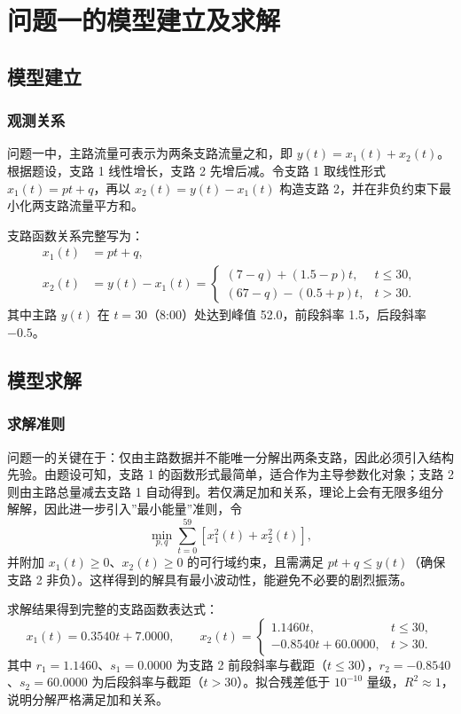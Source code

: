 \documentclass[UTF8,a4paper,fontset=none]{ctexart}
\numberwithin{equation}{section}
\begin{document}
\section{问题一的模型建立及求解}
\subsection{模型建立}
\subsubsection{观测关系}
问题一中，主路流量可表示为两条支路流量之和，即 $y(t)=x_1(t)+x_2(t)$。根据题设，支路 1 线性增长，支路 2 先增后减。令支路 1 取线性形式 $x_1(t)=pt+q$，再以 $x_2(t)=y(t)-x_1(t)$ 构造支路 2，并在非负约束下最小化两支路流量平方和。

支路函数关系完整写为：
\begin{align}
  x_1(t) &= pt + q, \label{eq:q1_b1} \\
  x_2(t) &= y(t) - x_1(t) = \begin{cases}
    (7-q)+(1.5-p)t, & t\le 30, \\
    (67-q)-(0.5+p)t, & t>30.
  \end{cases} \label{eq:q1_b2}
\end{align}
其中主路 $y(t)$ 在 $t=30$（8:00）处达到峰值 52.0，前段斜率 1.5，后段斜率 $-0.5$。

\subsection{模型求解}
\subsubsection{求解准则}
问题一的关键在于：仅由主路数据并不能唯一分解出两条支路，因此必须引入结构先验。由题设可知，支路 1 的函数形式最简单，适合作为主导参数化对象；支路 2 则由主路总量减去支路 1 自动得到。若仅满足加和关系，理论上会有无限多组分解解，因此进一步引入''最小能量''准则，令
\begin{equation}
\min_{p,q}\sum_{t=0}^{59}\left[x_1^2(t)+x_2^2(t)\right],
\end{equation}
并附加 $x_1(t)\ge 0$、$x_2(t)\ge 0$ 的可行域约束，且需满足 $pt+q\le y(t)$（确保支路 2 非负）。这样得到的解具有最小波动性，能避免不必要的剧烈振荡。

求解结果得到完整的支路函数表达式：
\[
x_1(t)=0.3540t+7.0000,\qquad
x_2(t)=\begin{cases}
1.1460t, & t\le 30,\\
-0.8540t+60.0000, & t>30.
\end{cases}
\]
其中 $r_1=1.1460$、$s_1=0.0000$ 为支路 2 前段斜率与截距（$t\le 30$），$r_2=-0.8540$、$s_2=60.0000$ 为后段斜率与截距（$t>30$）。拟合残差低于 $10^{-10}$ 量级，$R^2\approx 1$，说明分解严格满足加和关系。
\end{document}
